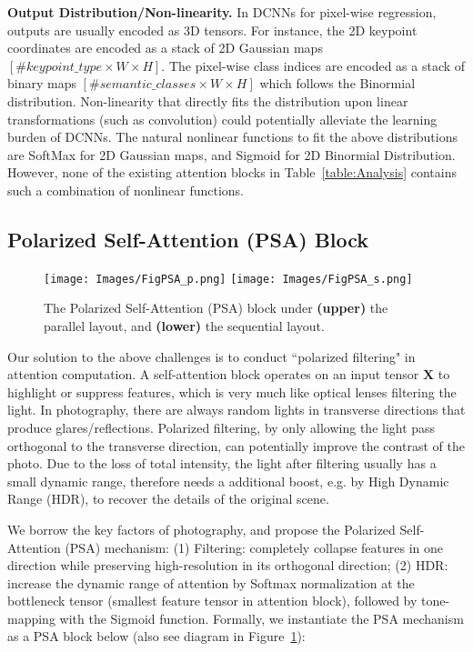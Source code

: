 \documentclass[10pt,twocolumn,letterpaper]{article}
\newcommand{\X}{\mathbf{X}}
\begin{document}
\textbf{Output Distribution/Non-linearity.} In DCNNs for pixel-wise regression, outputs are usually encoded as 3D tensors. For instance, the 2D keypoint coordinates are encoded as a stack of 2D Gaussian maps $[\#keypoint\_type\times W \times H]$. The pixel-wise class indices are encoded as a stack of binary maps $[\#semantic\_classes\times W \times H]$ which follows the Binormial distribution. Non-linearity that directly fits the distribution upon linear transformations (such as convolution) could potentially alleviate the learning burden of DCNNs. The natural nonlinear functions to fit the above distributions are SoftMax for 2D Gaussian maps, and Sigmoid for 2D Binormial Distribution. However, none of the existing attention blocks in Table~\ref{table:Analysis} contains such a combination of nonlinear functions. 

\subsection{Polarized Self-Attention (PSA) Block}
 
\begin{figure}[!htb]
\centering
\texttt{[image: Images/FigPSA\_p.png]}
\texttt{[image: Images/FigPSA\_s.png]}
\caption{The Polarized Self-Attention (PSA) block under \textbf{(upper)} the parallel layout,  and \textbf{(lower)} the sequential layout. }
  \label{fig:PSAlayer}
\end{figure}

Our solution to the above challenges is to conduct ``polarized filtering" in attention computation. A self-attention block operates on an input tensor $\X$ to highlight or suppress features, which is very much like optical lenses filtering the light. In photography, there are always random lights in transverse directions that produce glares/reflections. Polarized filtering, by only allowing the light pass orthogonal to the transverse direction, can potentially improve the contrast of the photo. Due to the loss of total intensity, the light after filtering usually has a small dynamic range, therefore needs a additional boost, e.g. by High Dynamic Range (HDR), to recover the details of the original scene. 

We borrow the key factors of photography, and propose the Polarized Self-Attention (PSA) mechanism: (1) Filtering: completely collapse features in one direction while preserving high-resolution in its orthogonal direction;  (2) HDR: increase the dynamic range of attention by Softmax normalization at the bottleneck tensor (smallest feature tensor in attention block), followed by tone-mapping with the Sigmoid function. Formally, we instantiate the PSA mechanism as a PSA block below (also see diagram in Figure~\ref{fig:PSAlayer}):
\end{document}
